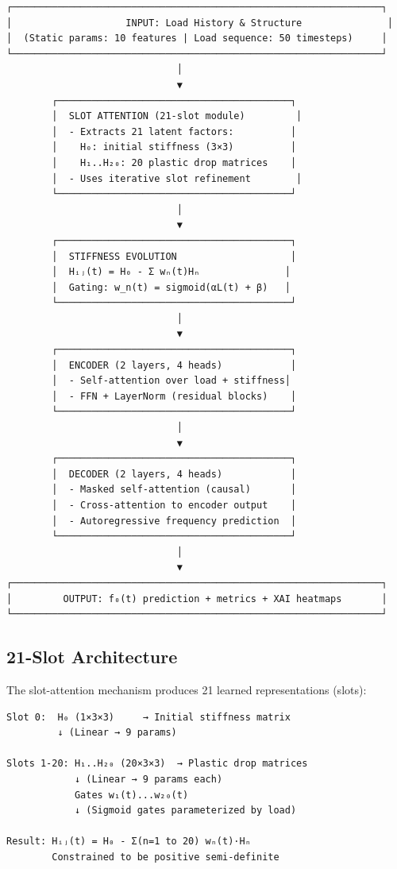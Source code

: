 \documentclass[11pt]{article}
\begin{document}
\begin{verbatim}
┌─────────────────────────────────────────────────────────────────┐
│                    INPUT: Load History & Structure               │
│  (Static params: 10 features | Load sequence: 50 timesteps)     │
└─────────────────────────────────────────────────────────────────┘
                              │
                              ▼
        ┌─────────────────────────────────────────┐
        │  SLOT ATTENTION (21-slot module)         │
        │  - Extracts 21 latent factors:          │
        │    H₀: initial stiffness (3×3)          │
        │    H₁..H₂₀: 20 plastic drop matrices    │
        │  - Uses iterative slot refinement        │
        └─────────────────────────────────────────┘
                              │
                              ▼
        ┌─────────────────────────────────────────┐
        │  STIFFNESS EVOLUTION                    │
        │  Hᵢⱼ(t) = H₀ - Σ wₙ(t)Hₙ               │
        │  Gating: w_n(t) = sigmoid(αL(t) + β)   │
        └─────────────────────────────────────────┘
                              │
                              ▼
        ┌─────────────────────────────────────────┐
        │  ENCODER (2 layers, 4 heads)            │
        │  - Self-attention over load + stiffness│
        │  - FFN + LayerNorm (residual blocks)    │
        └─────────────────────────────────────────┘
                              │
                              ▼
        ┌─────────────────────────────────────────┐
        │  DECODER (2 layers, 4 heads)            │
        │  - Masked self-attention (causal)       │
        │  - Cross-attention to encoder output    │
        │  - Autoregressive frequency prediction  │
        └─────────────────────────────────────────┘
                              │
                              ▼
┌─────────────────────────────────────────────────────────────────┐
│         OUTPUT: f₀(t) prediction + metrics + XAI heatmaps       │
└─────────────────────────────────────────────────────────────────┘
\end{verbatim}

\subsection{21-Slot Architecture}

The slot-attention mechanism produces 21 learned representations (slots):

\begin{verbatim}
Slot 0:  H₀ (1×3×3)     → Initial stiffness matrix
         ↓ (Linear → 9 params)
         
Slots 1-20: H₁..H₂₀ (20×3×3)  → Plastic drop matrices
            ↓ (Linear → 9 params each)
            Gates w₁(t)...w₂₀(t) 
            ↓ (Sigmoid gates parameterized by load)

Result: Hᵢⱼ(t) = H₀ - Σ(n=1 to 20) wₙ(t)·Hₙ
        Constrained to be positive semi-definite
\end{verbatim}
\end{document}
